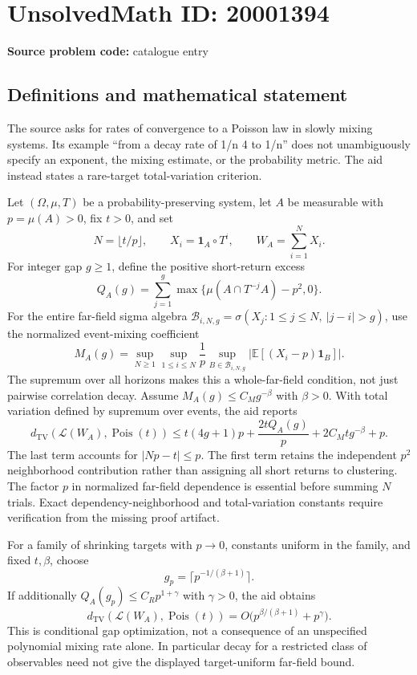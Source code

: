 \documentclass[11pt]{article}
\newcommand{\E}{\mathbb{E}}
\begin{document}
\section*{UnsolvedMath ID: 20001394}
\textbf{Source problem code:} catalogue entry
\subsection{Definitions and mathematical statement}
The source asks for rates of convergence to a Poisson law in slowly mixing systems. Its example ``from a decay rate of 1/n 4 to 1/n'' does not unambiguously specify an exponent, the mixing estimate, or the probability metric. The aid instead states a rare-target total-variation criterion.

Let \((\Omega,\mu,T)\) be a probability-preserving system, let \(A\) be measurable with \(p=\mu(A)>0\), fix \(t>0\), and set
\[
 N=\lfloor t/p\rfloor,\qquad X_i=\mathbf1_A\circ T^i,
 \qquad W_A=\sum_{i=1}^NX_i.
\]
For integer gap \(g\ge1\), define the positive short-return excess
\[
 Q_A(g)=\sum_{j=1}^g\max\{\mu(A\cap T^{-j}A)-p^2,0\}.
\]
For the entire far-field sigma algebra
\(\mathcal B_{i,N,g}=\sigma(X_j:1\le j\le N,\ |j-i|>g)\),
use the normalized event-mixing coefficient
\[
 M_A(g)=\sup_{N\ge1}\sup_{1\le i\le N}
 \frac1p\sup_{B\in\mathcal B_{i,N,g}}
 |\E[(X_i-p)\mathbf1_B]|.
\]
The supremum over all horizons makes this a whole-far-field condition, not just pairwise correlation decay. Assume \(M_A(g)\le C_Mg^{-\beta}\) with \(\beta>0\). With total variation defined by supremum over events, the aid reports
\[
 d_{\mathrm{TV}}(\mathcal L(W_A),\operatorname{Pois}(t))
 \le t(4g+1)p+\frac{2tQ_A(g)}p+2C_Mt g^{-\beta}+p.
\]
The last term accounts for \(|Np-t|\le p\). The first term retains the independent \(p^2\) neighborhood contribution rather than assigning all short returns to clustering. The factor \(p\) in normalized far-field dependence is essential before summing \(N\) trials. Exact dependency-neighborhood and total-variation constants require verification from the missing proof artifact.

For a family of shrinking targets with \(p\to0\), constants uniform in the family, and fixed \(t,\beta\), choose
\[
 g_p=\lceil p^{-1/(\beta+1)}\rceil.
\]
If additionally \(Q_A(g_p)\le C_Rp^{1+\gamma}\) with \(\gamma>0\), the aid obtains
\[
 d_{\mathrm{TV}}(\mathcal L(W_A),\operatorname{Pois}(t))
 =O\bigl(p^{\beta/(\beta+1)}+p^\gamma\bigr).
\]
This is conditional gap optimization, not a consequence of an unspecified polynomial mixing rate alone. In particular decay for a restricted class of observables need not give the displayed target-uniform far-field bound.
\end{document}
